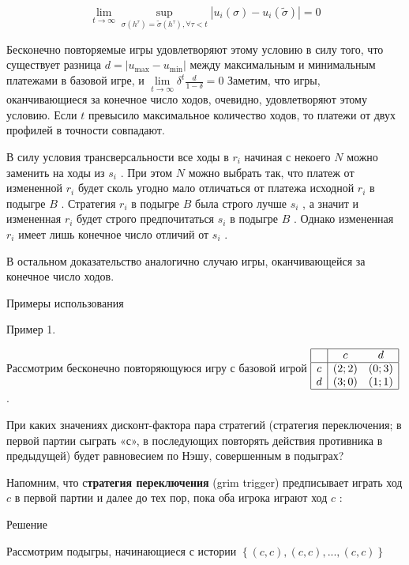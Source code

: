 \documentclass[pdftex,12pt,a4paper]{article}
\begin{document}
$$\mathop{\lim }\limits_{t\to \infty } \mathop{\sup }\limits_{\sigma \left(h^{\tau } \right)=\tilde{\sigma }\left(h^{\tau } \right),\forall \tau <t} \left|u_{i} \left(\sigma \right)-u_{i} \left(\tilde{\sigma }\right)\right|=0$$

Бесконечно повторяемые игры удовлетворяют этому условию в силу того, что существует разница  $d=\left|u_{\max } -u_{\min } \right|$  между максимальным и минимальным платежами  в базовой игре, и  $\mathop{\lim }\limits_{t\to \infty } \delta ^{t} \frac{d}{1-\delta } =0$  Заметим, что игры, оканчивающиеся за конечное число ходов, очевидно, удовлетворяют этому условию. Если  $t$  превысило максимальное количество ходов, то платежи от двух профилей в точности совпадают.

В силу условия трансверсальности все ходы в  $r_{i} $  начиная с некоего  $N$  можно заменить на ходы из  $s_{i} $ . При этом  $N$  можно выбрать так, что платеж от измененной  $r_{i} $  будет сколь угодно мало отличаться от платежа исходной  $r_{i} $  в подыгре  $B$ . Стратегия  $r_{i} $  в подыгре  $B$  была строго лучше  $s_{i} $ , а значит и измененная  $r_{i} $  будет строго предпочитаться  $s_{i} $  в подыгре  $B$ . Однако измененная  $r_{i} $  имеет лишь конечное число отличий от  $s_{i} $ .

В остальном доказательство аналогично случаю игры, оканчивающейся за конечное число ходов.

Примеры использования

Пример 1.

Рассмотрим бесконечно повторяющуюся игру с базовой игрой  $\begin{array}{|c|cc|}  \hline {} & {c} & {d} \\  \hline {c} & {\left(2;2\right)} & {\left(0;3\right)} \\ {d} & {\left(3;0\right)} & {\left(1;1\right)} \\  \hline  \end{array}$ .

При каких значениях дисконт-фактора пара стратегий (стратегия переключения; в первой партии сыграть «с», в последующих повторять действия противника в предыдущей) будет равновесием по Нэшу, совершенным в подыграх?

Напомним, что с{\bf тратегия переключения} (grim trigger) предписывает играть ход  $c$  в первой партии и далее до тех пор, пока оба игрока играют ход  $c$ :

Решение

Рассмотрим подыгры, начинающиеся с истории  $\left\{\left(c,c\right),\left(c,c\right),...,\left(c,c\right)\right\}$
\end{document}
